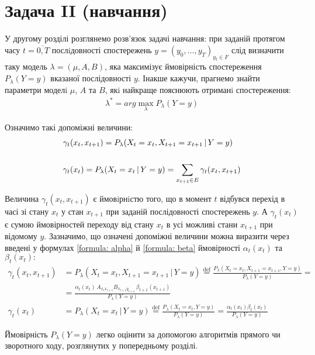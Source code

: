 \section{Задача II (навчання)}

У другому розділі розглянемо розв'язок задачі навчання: при заданій протягом часу $t=\overline{0,T}$ послiдовності спостережень $y=(y_0, \ldots , y_T)_{y_t\in F}$ слід визначити таку модель $\lambda=(\mu,A,B)$, яка максимізує ймовірність спостереження $P_\lambda(Y = y)$ вказаної послідовності $y$. Інакше кажучи, прагнемо знайти параметри моделi $\mu$, $A$ та $B$, якi найкраще пояснюють отриманi спостереження:
\begin{align*}
    \lambda^{*}=arg\max\limits_{\lambda}P_\lambda(Y=y)
\end{align*}

Означимо такі допоміжні величини:
\begin{align}
    &\gamma_t(x_t,x_{t+1})=P_\lambda(X_t=x_t,X_{t+1}=x_{t+1} \, |\, Y=y) \notag \\
    &\label{formula: gamma} \\
    &\gamma_t(x_t)=P_\lambda(X_t=x_t \, |\, Y=y)=\sum_{x_{t+1}\in E}\gamma_t(x_t,x_{t+1}) \notag
\end{align}

Величина $\gamma_t(x_t,x_{t+1})$ є ймовiрнiстю того, що в момент $t$ відбувся перехід в часі зі стану $x_t$ у стан $x_{t+1}$ при заданій послідовності спостережень $y$. А $\gamma_t(x_t)$ є сумою ймовірностей переходу від стану $x_t$ в усі можливі стани $x_{t+1}$ при відомому $y$. Зазначимо, що означені допоміжні величини можна виразити через введені у формулах \eqref{formula: alpha} й \eqref{formula: beta} ймовірності $\alpha_t(x_t)$ та $\beta_t(x_t):$
\begin{align*}
    \gamma_t(x_t,x_{t+1})&=P_\lambda(X_t=x_t,X_{t+1}=x_{t+1} \, |\, Y=y)\overset{\mathrm{def}}{=}
    \frac{P_\lambda(X_t=x_t,X_{t+1}=x_{t+1},Y=y)}{P_\lambda(Y=y)}= \\
    &=\frac{\alpha_t(x_t)\,A_{x_t x_{t+1}}B_{x_{t+1}y_{t+1}}\,\beta_{t+1}(x_{t+1})}{P_\lambda(Y=y)} \\
    \gamma_t(x_t)&=P_\lambda(X_t=x_t \, |\, Y=y)\overset{\mathrm{def}}{=}\frac{P_\lambda(X_t=x_t,Y=y)}{P_\lambda(Y=y)}=
    \frac{\alpha_t(x_t)\beta_t(x_t)}{P_\lambda(Y=y)}
\end{align*}

Ймовірність $P_\lambda(Y=y)$ легко оцінити за допомогою алгоритмів прямого чи зворотного ходу, розглянутих у попередньому розділі. 

